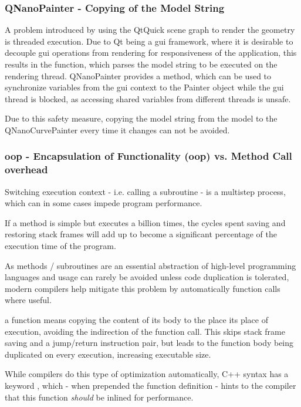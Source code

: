 \subsubsection{QNanoPainter - Copying of the Model String}
A problem introduced by using the QtQuick scene graph to render the geometry is threaded execution. Due to Qt being a \gls{gui} framework, where it is desirable to decouple \gls{gui} operations from rendering for responsiveness of the application, this results in the  function, which parses the model string to be executed on the rendering thread. QNanoPainter provides a  method, which can be used to synchronize variables from the \gls{gui} context to the Painter object while the \gls{gui} thread is blocked, as accessing shared variables from different threads is unsafe.

Due to this safety measure, copying the model string from the model to the QNanoCurvePainter every time it changes can not be avoided.

\subsubsection{\gls{oop} - Encapsulation of Functionality (\gls{oop}) vs. Method Call overhead}

Switching execution context - i.e. calling a subroutine - is a multistep process, which can in some cases impede program performance.

If a method is simple but executes a billion times, the cycles spent saving and restoring stack frames will add up to become a significant percentage of the execution time of the program.

As methods / subroutines are an essential abstraction of high-level programming languages and usage can rarely be avoided unless code duplication is tolerated, modern compilers help mitigate this problem by automatically  function calls where useful.

 a function means copying the content of its body to the place its place of execution, avoiding the indirection of the function call. This skips stack frame saving and a jump/return instruction pair, but leads to the function body being duplicated on every execution, increasing executable size.

While compilers do this type of optimization automatically, C++ syntax has a keyword , which - when prepended the function definition - hints to the compiler that this function \emph{should} be inlined for performance.

